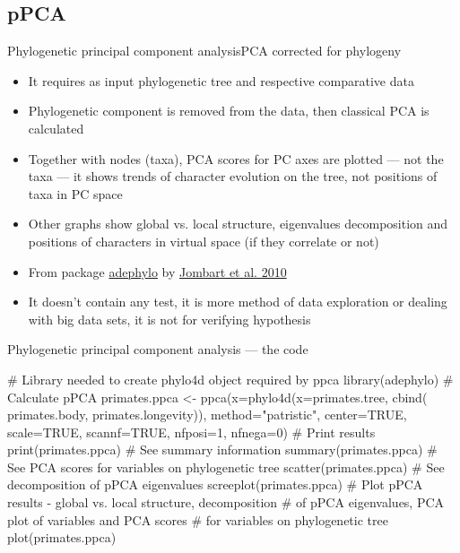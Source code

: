 \documentclass[compress, ucs, xelatex, 11pt, xcolor=svgnames,
  hyperref={
    bookmarks=true,
    unicode=true,
    colorlinks=true,
    pdftitle={Molecular data in R},
    plainpages=false,
    pdfauthor={Vojtech Zeisek},
    pdfsubject={Course about phylogeny and evolution in R},
    pdfcreator={XeLaTeX},
    pdfkeywords={R, evolution, phylogeny, molecular data},
    linkcolor=Tomato,
    anchorcolor=SaddleBrown,
    citecolor=Goldenrod,
    filecolor=DarkMagenta,
    menucolor=Sienna,
    urlcolor=DarkTurquoise,
    pdftex},
  url={hyphens, lowtilde} %
  ]{beamer}
\begin{document}
\subsection{pPCA}

\begin{frame}{Phylogenetic principal component analysis}{PCA corrected for phylogeny}
  \begin{itemize}
    \item It requires as input phylogenetic tree and respective comparative data
    \item Phylogenetic component is removed from the data, then classical PCA is calculated
    \item Together with nodes (taxa), PCA scores for PC axes are plotted --- not the taxa --- it shows trends of character evolution on the tree, not positions of taxa in PC space
    \item Other graphs show global vs. local structure, eigenvalues decomposition and positions of characters in virtual space (if they correlate or not)
    \item From package \href{https://academic.oup.com/bioinformatics/article-lookup/doi/10.1093/bioinformatics/btq292}{adephylo} by \href{https://www.sciencedirect.com/science/article/pii/S0022519310001736}{Jombart et al. 2010}
    \item It doesn't contain any test, it is more method of data exploration or dealing with big data sets, it is not for verifying hypothesis
  \end{itemize}
\end{frame}

\begin{frame}[fragile]{Phylogenetic principal component analysis --- the code}
  \begin{spluscode}
    # Library needed to create phylo4d object required by ppca
    library(adephylo)
    # Calculate pPCA
    primates.ppca <- ppca(x=phylo4d(x=primates.tree, cbind(
      primates.body, primates.longevity)), method="patristic",
      center=TRUE, scale=TRUE, scannf=TRUE, nfposi=1, nfnega=0)
    # Print results
    print(primates.ppca)
    # See summary information
    summary(primates.ppca)
    # See PCA scores for variables on phylogenetic tree
    scatter(primates.ppca)
    # See decomposition of pPCA eigenvalues
    screeplot(primates.ppca)
    # Plot pPCA results - global vs. local structure, decomposition
    # of pPCA eigenvalues, PCA plot of variables and PCA scores
    # for variables on phylogenetic tree
    plot(primates.ppca)
  \end{spluscode}
\end{frame}
\end{document}
